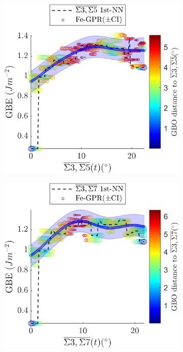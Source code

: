 \documentclass[final,twocolumn,12pt]{elsarticle}
\begin{document}
	\begin{figure}[!htb]
		\centering
		\begin{subfigure}[b]{0.48\textwidth}
			\includegraphics[width=\textwidth]{figures/tunnel-3-5-kim.png}
			\caption{}
			\label{fig:tunnel-3-5-kim}
		\end{subfigure}
		\hfill
		\begin{subfigure}[b]{0.48\textwidth}
			\includegraphics[width=\textwidth]{figures/tunnel-3-7-kim.png}
			\caption{}
			\label{fig:tunnel-3-7-kim}
		\end{subfigure}
		

\end{figure}
\end{document}

